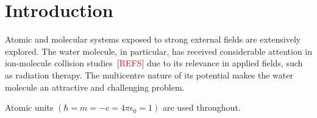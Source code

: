 \chapter{Introduction}
\label{cha:introduction}


Atomic and molecular systems exposed to strong external fields are
extensively explored. The water molecule, in particular, has received
considerable attention in ion-molecule collision
studies~[\textcolor{red}{REFS}] due to its relevance in applied
fields, such as radiation therapy. The multicentre nature of its
potential makes the water molecule an attractive and challenging
problem.




Atomic units $(\hbar = m = -e = 4\pi\epsilon_{0} = 1)$ are used
throughout.
































